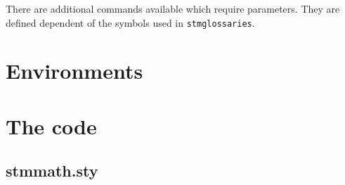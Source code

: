 \documentclass{scrartcl}
\begin{document}
There are additional commands available which require parameters. They are defined dependent of the symbols used in \texttt{stmglossaries}.

\section{Environments}

\newpage

\appendix

\newpage
\section{The code}

\subsection{stmmath.sty}


\end{document}
